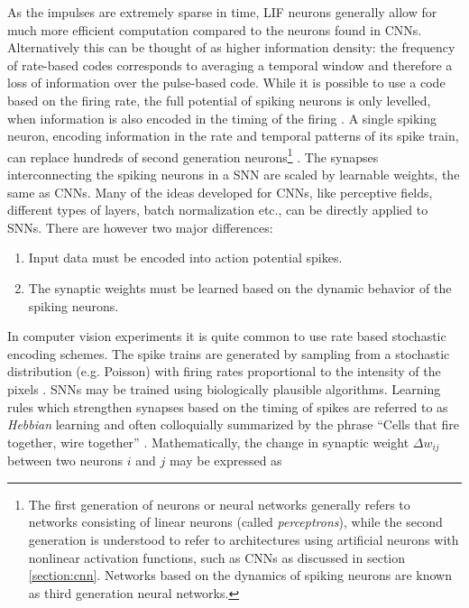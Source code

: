 As the impulses are extremely sparse in time, LIF neurons generally allow for much more efficient computation compared to the neurons found in CNNs. Alternatively this can be thought of as higher information density: the frequency of rate-based codes corresponds to averaging a temporal window and therefore a loss of information over the pulse-based code. While it is possible to use a code based on the firing rate, the full potential of spiking neurons is only levelled, when information is also encoded in the timing of the firing \cite{bohte2002unsupervised,bohte2004evidence,hopfield1995pattern}. A single spiking neuron, encoding information in the rate and temporal patterns of its spike train, can replace hundreds of second generation neurons\footnote{The first generation of neurons or neural networks generally refers to networks consisting of linear neurons (called \emph{perceptrons}), while the second generation is understood to refer to architectures using artificial neurons with nonlinear activation functions, such as CNNs as discussed in section \ref{section:cnn}. Networks based on the dynamics of spiking neurons are known as third generation neural networks.} \cite{gerstner2002spiking,maass1997networks,rieke1999spikes}. The synapses interconnecting the spiking neurons in a SNN are scaled by learnable weights, the same as CNNs. Many of the ideas developed for CNNs, like perceptive fields, different types of layers, batch normalization etc., can be directly applied to SNNs. There are however two major differences:
\begin{enumerate}
    \item Input data must be encoded into action potential spikes.
    \item The synaptic weights must be learned based on the dynamic behavior of the spiking neurons.
\end{enumerate}
In computer vision experiments it is quite common to use rate based stochastic encoding schemes. The spike trains are generated by sampling from a stochastic distribution (e.g. Poisson) with firing rates proportional to the intensity of the pixels \cite{diehl2015unsupervised}. SNNs may be trained using biologically plausible algorithms. Learning rules which strengthen synapses based on the timing of spikes are referred to as \emph{Hebbian} learning and often colloquially summarized by the phrase \enquote{Cells that fire together, wire together} \cite{hebbs1949organization}. Mathematically, the change in synaptic weight $\Delta w_{ij}$ between two neurons $i$ and $j$ may be expressed as
